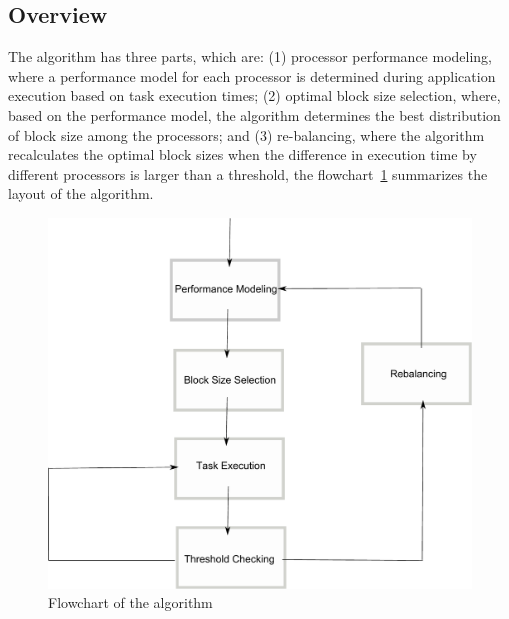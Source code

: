 \documentclass[journal]{IEEEtran}
\begin{document}
\subsection{Overview}
The algorithm has three parts, which are: (1) processor 
performance modeling, where a performance model for each processor is determined
during application execution based on task execution times; (2) optimal block
size selection, where, based on the performance model, the algorithm determines
the best distribution of block size among the processors; and (3) re-balancing,
where the algorithm recalculates the optimal block sizes when the difference in
execution time by different processors is larger than a threshold, the flowchart~\ref{fig: fluxo1} summarizes the layout of the algorithm.

%
\begin{figure}[!t]
	\centering
			\includegraphics[scale=0.36]{Fluxo.pdf} 				
	\caption{Flowchart of the algorithm}
	\label{fig: fluxo1}
\end{figure}
\end{document}

